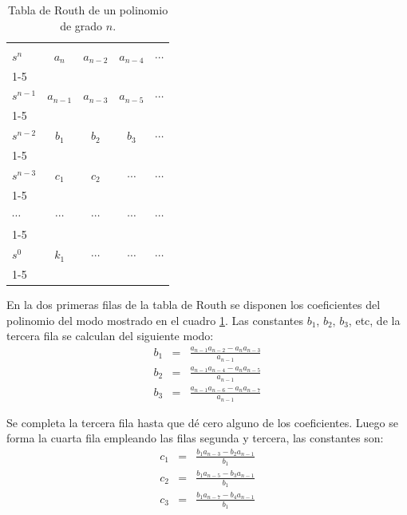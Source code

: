 \begin{table}
	\centering
	\begin{tabular}{|l||c|c|c|c|}
		\hline
		&          &      &      &  \\
		$s^n$    & $a_n$         & $a_{n-2}$     & $a_{n-4}$     & $\cdots$ \\
		\cline{1-5}
		&          &      &      &  \\
		$s^{n-1}$  & $a_{n-1}$    & $a_{n-3}$     & $a_{n-5}$     & $\cdots$\\
		\cline{1-5}
		&          &      &      &  \\
		$s^{n-2}$ & $b_1$         & $b_2$     & $b_3$    & $\cdots$ \\
		\cline{1-5}
		&          &      &      &  \\
		$s^{n-3}$      & $c_1$         & $c_2$     & $\cdots$     & $\cdots$ \\
		\cline{1-5}
		&          &      &      &  \\
		$\cdots$      & $\cdots$         & $\cdots$     & $\cdots$    & $\cdots$\\
		\cline{1-5}
		&          &      &      &  \\
		$s^0$      & $k_1$         & $\cdots$     & $\cdots$    & $\cdots$\\
		\cline{1-5}
		\hline
	\end{tabular}
	\caption{Tabla de Routh de un polinomio de grado $n$.}\label{tabla1}
\end{table}

En la dos primeras filas de la tabla de Routh se disponen los
coeficientes del polinomio del modo mostrado en el cuadro
\ref{tabla1}. Las constantes $b_1$, $b_2$, $b_3$, etc, de la tercera
fila se calculan del siguiente modo:
\begin{eqnarray}
	\nonumber
	b_1 &=& \frac{\displaystyle a_{n-1} a_{n-2}-a_n a_{n-3}}{\displaystyle a_{n-1}} \\
	\nonumber
	b_2 &=& \frac{\displaystyle a_{n-1} a_{n-4}-a_n a_{n-5}}{\displaystyle a_{n-1}} \\
	\nonumber
	b_3 &=& \frac{\displaystyle a_{n-1} a_{n-6}-a_n a_{n-7}}{\displaystyle a_{n-1}}
\end{eqnarray}

Se completa la tercera fila hasta que dé cero alguno de los
coeficientes. Luego se forma la cuarta fila empleando las filas
segunda y tercera, las constantes son:
\begin{eqnarray}
	\nonumber
	c_1 &=& \frac{\displaystyle b_1 a_{n-3}-b_2 a_{n-1}}{\displaystyle b_1} \\
	\nonumber
	c_2 &=& \frac{\displaystyle b_1 a_{n-5}-b_3 a_{n-1}}{\displaystyle b_1} \\
	\nonumber
	c_3 &=& \frac{\displaystyle b_1 a_{n-7}-b_4 a_{n-1}}{\displaystyle b_1} \\
\end{eqnarray}

